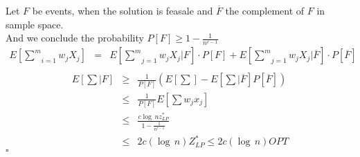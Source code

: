 \documentclass[ngerman,a4paper,11pt]{article}
\begin{document}
\begin{description}
      Let $F$ be events, when the solution is feasale and
      $\overline{F}$ the complement of $F$ in sample space.\\
      And we conclude the probability $P[F] \geq 1 - \frac{1}{n^{c-1}}$
      $$\begin{array}{rcl}
         E[\underset{i=1}{\overset{m}{\sum}} w_jX_j] &=& 
            E[\underset{j=1}{\overset{m}{\sum}} w_jX_j | F]\cdot P[F] + 
            E[\underset{j=1}{\overset{m}{\sum}}w_jX_j | \overline{F}] \cdot P[\overline{F}]\\
      \end{array}$$
      $$\begin{array}{rcl}
            E[\sum | F] &\geq& \frac{1}{P[F]}\left( E[\sum] - E[\sum | \overline{F}] P[\overline{F}]\right)\\
            &\leq & \frac{1}{P[F]} E[\sum w_jx_j]\\
            &\leq & \frac{c\log \, n z_{LP}^*}{1-\frac{1}{n^{c-1}}}\\
            & \leq & 2c (\log \, n) Z_{LP}^* \leq 2c (\log \, n) OPT
      \end{array}$$
      \mbox{}\hfill $\square$
\end{description}
\end{document}
